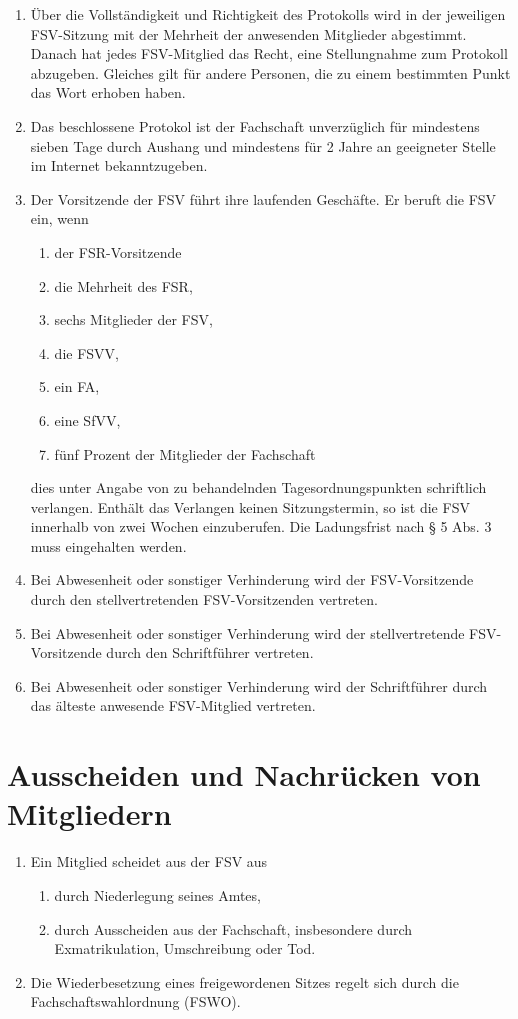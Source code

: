 \documentclass{article}
\begin{document}
\begin{enumerate}[(1)]
	\item Über die Vollständigkeit und Richtigkeit des Protokolls wird in der jeweiligen FSV-Sitzung mit der Mehrheit der anwesenden Mitglieder abgestimmt. Danach hat jedes FSV-Mitglied das Recht, eine Stellungnahme zum Protokoll abzugeben. Gleiches gilt für andere Personen, die zu einem bestimmten Punkt das Wort erhoben haben.
	\item Das beschlossene Protokol ist der Fachschaft
    unverzüglich für mindestens sieben Tage durch Aushang und mindestens für 2 Jahre an geeigneter Stelle im Internet bekanntzugeben.
	\item Der Vorsitzende der FSV führt ihre laufenden Geschäfte. Er beruft die FSV ein, wenn
	\begin{enumerate}[1.]
	    \item der FSR-Vorsitzende
        \item die Mehrheit des FSR,
		\item sechs Mitglieder der FSV,
		\item die FSVV,
		\item ein FA,
		\item eine SfVV,
		\item fünf Prozent der Mitglieder der Fachschaft 
	\end{enumerate}
	dies unter Angabe von zu behandelnden Tagesordnungspunkten schriftlich verlangen. Enthält das Verlangen keinen Sitzungstermin, so ist die FSV innerhalb von zwei Wochen einzuberufen. Die Ladungsfrist nach § 5 Abs. 3 muss eingehalten werden.
	\item Bei Abwesenheit oder sonstiger Verhinderung wird der FSV-Vorsitzende durch den stellvertretenden FSV-Vorsitzenden vertreten.
	\item Bei Abwesenheit oder sonstiger Verhinderung wird der stellvertretende FSV-Vorsitzende durch den Schriftführer vertreten.
	\item Bei Abwesenheit oder sonstiger Verhinderung wird der Schriftführer durch das älteste anwesende FSV-Mitglied vertreten.
\end{enumerate}

\section{Ausscheiden und Nachrücken von Mitgliedern}
\begin{enumerate}[(1)]
    \item Ein Mitglied scheidet aus der FSV aus
    	\begin{enumerate}[1.]
	    \item durch Niederlegung seines Amtes,
        \item durch Ausscheiden aus der Fachschaft, insbesondere durch Exmatrikulation, Umschreibung oder Tod.
	\end{enumerate}
	\item Die Wiederbesetzung eines freigewordenen Sitzes regelt sich durch die Fachschaftswahlordnung (FSWO). 
\end{enumerate}
\end{document}
